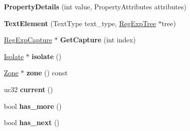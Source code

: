 \begin{DoxyCompactItemize}
\item 
{\bfseries Property\+Details} (int value, Property\+Attributes attributes)\hypertarget{classv8_1_1internal_1_1_b_a_s_e___e_m_b_e_d_d_e_d_a47da0ebe388a0ccc1036889798cac293}{}\label{classv8_1_1internal_1_1_b_a_s_e___e_m_b_e_d_d_e_d_a47da0ebe388a0ccc1036889798cac293}

\item 
{\bfseries Text\+Element} (Text\+Type text\+\_\+type, \hyperlink{classv8_1_1internal_1_1_reg_exp_tree}{Reg\+Exp\+Tree} $\ast$tree)\hypertarget{classv8_1_1internal_1_1_b_a_s_e___e_m_b_e_d_d_e_d_aa28d74b8053016ca5d430e44b9a637b3}{}\label{classv8_1_1internal_1_1_b_a_s_e___e_m_b_e_d_d_e_d_aa28d74b8053016ca5d430e44b9a637b3}

\item 
\hyperlink{classv8_1_1internal_1_1_reg_exp_capture}{Reg\+Exp\+Capture} $\ast$ {\bfseries Get\+Capture} (int index)\hypertarget{classv8_1_1internal_1_1_b_a_s_e___e_m_b_e_d_d_e_d_a935fa2e486588bc075891fff37e76aa0}{}\label{classv8_1_1internal_1_1_b_a_s_e___e_m_b_e_d_d_e_d_a935fa2e486588bc075891fff37e76aa0}

\item 
\hyperlink{classv8_1_1internal_1_1_isolate}{Isolate} $\ast$ {\bfseries isolate} ()\hypertarget{classv8_1_1internal_1_1_b_a_s_e___e_m_b_e_d_d_e_d_a32ada69909c248ae5d86cb56b08a5cc9}{}\label{classv8_1_1internal_1_1_b_a_s_e___e_m_b_e_d_d_e_d_a32ada69909c248ae5d86cb56b08a5cc9}

\item 
\hyperlink{classv8_1_1internal_1_1_zone}{Zone} $\ast$ {\bfseries zone} () const \hypertarget{classv8_1_1internal_1_1_b_a_s_e___e_m_b_e_d_d_e_d_a52fc0e306aa3628bf7e2d0c397a1f5c6}{}\label{classv8_1_1internal_1_1_b_a_s_e___e_m_b_e_d_d_e_d_a52fc0e306aa3628bf7e2d0c397a1f5c6}

\item 
uc32 {\bfseries current} ()\hypertarget{classv8_1_1internal_1_1_b_a_s_e___e_m_b_e_d_d_e_d_aba5dbfba6ad7f9c4be53ea9c8cea63e0}{}\label{classv8_1_1internal_1_1_b_a_s_e___e_m_b_e_d_d_e_d_aba5dbfba6ad7f9c4be53ea9c8cea63e0}

\item 
bool {\bfseries has\+\_\+more} ()\hypertarget{classv8_1_1internal_1_1_b_a_s_e___e_m_b_e_d_d_e_d_ad0e40eba724df058ebb4d3731aa0b11c}{}\label{classv8_1_1internal_1_1_b_a_s_e___e_m_b_e_d_d_e_d_ad0e40eba724df058ebb4d3731aa0b11c}

\item 
bool {\bfseries has\+\_\+next} ()\hypertarget{classv8_1_1internal_1_1_b_a_s_e___e_m_b_e_d_d_e_d_aa2ac82cadaae4e30bffa924340110f78}{}\label{classv8_1_1internal_1_1_b_a_s_e___e_m_b_e_d_d_e_d_aa2ac82cadaae4e30bffa924340110f78}


\end{DoxyCompactItemize}
